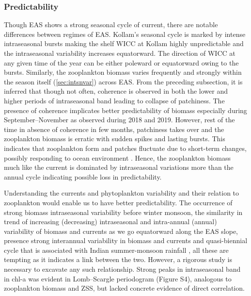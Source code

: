\documentclass[authoryear,review,12pt]{elsarticle}
\begin{document}
 	\subsubsection{Predictability}
    Though EAS shows a strong seasonal cycle of current, there are notable differences between regimes of EAS. Kollam's seasonal cycle is marked by intense intraseasonal bursts making the shelf WICC at Kollam highly unpredictable \citep{chaudhuri2021observed} and the intraseasonal variability increases equatorward. The direction of WICC at any given time of the year can be either poleward or equatorward owing to the bursts. Similarly, the zooplankton biomass varies frequently and strongly within the season itself (\cref{sec:intsnvar}) across EAS. From the preceding subsection, it is inferred that though not often, coherence is observed in both the lower and higher periods of intraseasonal band leading to collapse of patchiness. The presence of coherence implicates better predictability of biomass especially during September--November as observed during 2018 and 2019. However, rest of the time in absence of coherence in few months, patchiness takes over and the zooplankton biomass is erratic with sudden spikes and lasting bursts. This indicates that zooplankton form and patches fluctuate due to short-term changes, possibly responding to ocean environment \citep{folt1999biological,raghukumar2003marine,anil2021short}. Hence, the zooplankton biomass much like the current is dominated by intraseasonal variations more than the annual cycle indicating possible loss in predictability. 
         
	Understanding the currents and phytoplankton variability and their relation to zooplankton would enable us to have better predictability. The occurrence of strong biomass intraseasonal variability before winter monsoon, the similarity in trend of increasing (decreasing) intraseasonal and intra-annual (annual) variability  of biomass and currents as we go equatorward along the EAS slope, presence strong interannual variability in biomass and currents and quasi-biennial cycle that is associated with Indian summer-monsoon rainfall \citep{mooley1984fluctuations,bhalme1987tropical,meehl2002tropospheric}, all these are tempting as it indicates a link between the two. However, a rigorous study is necessary to excavate any such relationship. Strong peaks in intraseasonal band in chl-a was evident in Lomb--Scargle periodogram (Figure S4), analogous to zooplankton biomass and ZSS, but lacked concrete evidence of direct correlation. 
 	  
\end{document}
